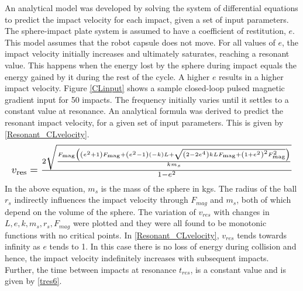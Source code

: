 \documentclass[letterpaper, 10 pt, conference]{ieeeconf}  %
\begin{document}
An analytical model was developed by solving the system of differential equations to predict the impact velocity for each impact, given a set of input parameters. The sphere-impact plate system is assumed to have a coefficient of restitution, $e$. This model assumes that the robot capsule does not move. For all values of $e$, the impact velocity initially increases and ultimately saturates, reaching a resonant value. This happens when the energy lost by the sphere during impact equals the energy gained by it during the rest of the cycle. A higher $e$ results in a higher impact velocity.  Figure \ref{CLinput} shows a sample closed-loop pulsed magnetic gradient input for 50 impacts. The frequency initially varies until it settles to a constant value at resonance. An analytical formula was derived to predict the resonant impact velocity, for a given set of input parameters. This is given by \cref{Resonant_CLvelocity}.
%	
\begin{equation}
\resizebox{\linewidth}{!}
{$
	v_{\text{res}}=\frac{2 \sqrt{\frac{F_{\text{mag}} \left(\left(e^2+1\right) F_{\text{mag}}+\left(e^2-1\right) (-k) L+\sqrt{\left(2-2 e^4\right) k L F_{\text{mag}}+\left(1+e^2\right)^2 F_{\text{mag}}^2}\right)}{k m_s}}}{1-e^2}
	$}
\label{Resonant_CLvelocity}
\end{equation}
In the above equation, $m_s$ is the mass of the sphere in kgs. The radius of the ball $r_s$ indirectly influences the impact velocity through $F_{mag}$ and $m_s$, both of which depend on the volume of the sphere. The variation of $v_{res}$ with changes in $L,e,k,m_s,r_s,F_{mag}$ were plotted and they were all found to be monotonic functions with no critical points. In \cref{Resonant_CLvelocity}, $v_{res}$ tends towards infinity as $e$ tends to 1. In this case there is no loss of energy during collision and hence, the impact velocity indefinitely increases with subsequent impacts. Further, the time between impacts at resonance $t_{res}$, is a constant value and is given by \cref{tres6}.
\end{document}
